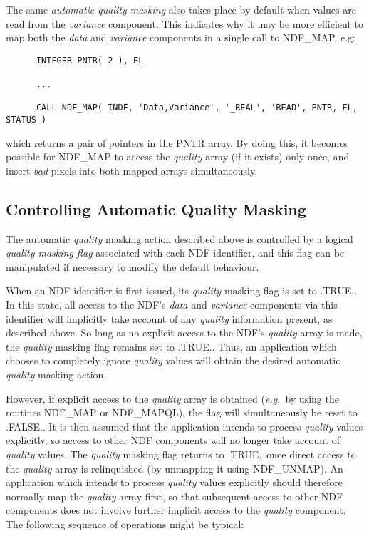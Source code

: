 \documentclass[twoside,11pt]{article}
\newcommand{\htmlref}[2]{#1}
\newcommand{\xlabel}[1]{}
\newcommand{\st}[1]{{\em{#1}}}
\begin{document}
The same \st{automatic quality masking\/} also takes place by default when 
values are read from the \st{variance\/} component.
This indicates why it may be more efficient to map both the \st{data\/} and
\st{variance\/} components in a single call to \htmlref{NDF\_MAP}{NDF_MAP}, e.g:

\small
\begin{verbatim}
      INTEGER PNTR( 2 ), EL

      ...

      CALL NDF_MAP( INDF, 'Data,Variance', '_REAL', 'READ', PNTR, EL, STATUS )
\end{verbatim}
\normalsize

which returns a pair of pointers in the PNTR array.
By doing this, it becomes possible for NDF\_MAP to access the \st{quality\/}
array (if it exists) only once, and insert \st{bad\/} pixels into both mapped
arrays simultaneously. 

\subsection{\xlabel{controlling_automatic_quality_masking}Controlling Automatic Quality Masking}

The automatic \st{quality\/} masking action described above is controlled by a
logical \st{quality masking flag\/} associated with each NDF identifier, and
this flag can be manipulated if necessary to modify the default behaviour. 

When an NDF identifier is first issued, its \st{quality\/} masking flag is set to 
.TRUE..
In this state, all access to the NDF's \st{data\/} and \st{variance\/} components
via this identifier will implicitly take account of any \st{quality\/}
information present, as described above. 
So long as no explicit access to the NDF's \st{quality\/} array is made, the
\st{quality\/} masking flag remains set to .TRUE.. 
Thus, an application which chooses to completely ignore \st{quality\/} values
will obtain the desired automatic \st{quality\/} masking action.

However, if explicit access to the \st{quality\/} array is obtained
(\st{e.g.}\ by using the routines \htmlref{NDF\_MAP}{NDF_MAP} or
\htmlref{NDF\_MAPQL}{NDF_MAPQL}), the flag will 
simultaneously be reset to .FALSE.. 
It is then assumed that the application intends to process \st{quality\/} values
explicitly, so access to other NDF components will no longer take account of
\st{quality\/} values. 
The \st{quality\/} masking flag returns to .TRUE.\ once direct access to the
\st{quality\/} array is relinquished (by unmapping it using \htmlref{NDF\_UNMAP}{NDF_UNMAP}).
An application which intends to process \st{quality\/} values explicitly should 
therefore normally map the \st{quality\/} array first, so that subsequent access
to  other NDF components does not involve further implicit access to
the \st{quality\/} component. 
The following sequence of operations might be typical:
\end{document}
